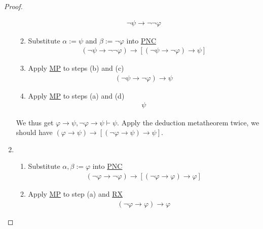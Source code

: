 \documentclass{treatise}
\begin{document}
\begin{proof}
\begin{enumerate}
\begin{enumerate}
        \begin{align*}
            \neg \psi \to \neg \neg \varphi
        \end{align*}
        \item Substitute $\alpha := \psi$ and $\beta := \neg \varphi$ into \hyperref[HPL-A-PNC]{PNC}
        \begin{align*}
            (\neg \psi \to \neg \neg \varphi) \to [(\neg \psi \to \neg \varphi) \to \psi]
        \end{align*}
        \item Apply \hyperref[HPL-R-MP]{MP} to steps (b) and (c)
        \begin{align*}
            (\neg \psi \to \neg \varphi) \to \psi
        \end{align*}
        \item Apply \hyperref[HPL-R-MP]{MP} to steps (a) and (d)
        \begin{align*}
            \psi
        \end{align*}
    \end{enumerate}
    We thus get $\varphi \to \psi, \neg \varphi \to \psi \vdash \psi$. Apply the deduction metatheorem twice, we should have $(\varphi \to \psi) \to [(\neg \varphi \to \psi) \to \psi]$.
    \item
    \begin{enumerate}
        \item Substitute $\alpha, \beta := \varphi$ into \hyperref[HPL-A-PNC]{PNC}
        \begin{align*}
            (\neg \varphi \to \neg \varphi) \to [(\neg \varphi \to \varphi) \to \varphi]
        \end{align*}
        \item Apply \hyperref[HPL-R-MP]{MP} to step (a) and \hyperref[HPL-T-RX]{RX}
        \begin{align*}
            (\neg \varphi \to \varphi) \to \varphi
        \end{align*}
    \end{enumerate}
\end{enumerate}
\end{proof}
\end{document}
